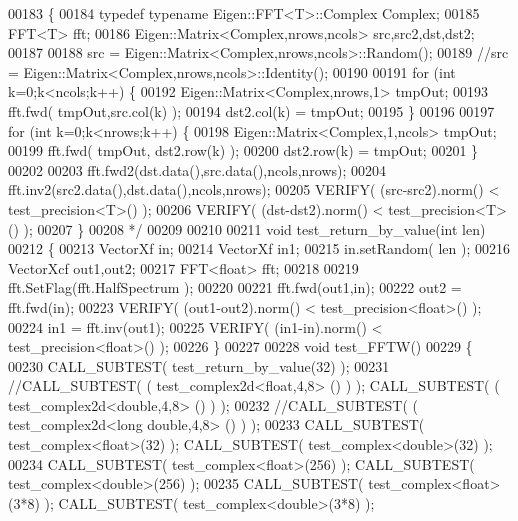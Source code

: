 \begin{DoxyCode}
00183 \textcolor{comment}{\{}
00184 \textcolor{comment}{    typedef typename Eigen::FFT<T>::Complex Complex;}
00185 \textcolor{comment}{    FFT<T> fft;}
00186 \textcolor{comment}{    Eigen::Matrix<Complex,nrows,ncols> src,src2,dst,dst2;}
00187 \textcolor{comment}{}
00188 \textcolor{comment}{    src = Eigen::Matrix<Complex,nrows,ncols>::Random();}
00189 \textcolor{comment}{    //src =  Eigen::Matrix<Complex,nrows,ncols>::Identity();}
00190 \textcolor{comment}{}
00191 \textcolor{comment}{    for (int k=0;k<ncols;k++) \{}
00192 \textcolor{comment}{        Eigen::Matrix<Complex,nrows,1> tmpOut;}
00193 \textcolor{comment}{        fft.fwd( tmpOut,src.col(k) );}
00194 \textcolor{comment}{        dst2.col(k) = tmpOut;}
00195 \textcolor{comment}{    \}}
00196 \textcolor{comment}{}
00197 \textcolor{comment}{    for (int k=0;k<nrows;k++) \{}
00198 \textcolor{comment}{        Eigen::Matrix<Complex,1,ncols> tmpOut;}
00199 \textcolor{comment}{        fft.fwd( tmpOut,  dst2.row(k) );}
00200 \textcolor{comment}{        dst2.row(k) = tmpOut;}
00201 \textcolor{comment}{    \}}
00202 \textcolor{comment}{}
00203 \textcolor{comment}{    fft.fwd2(dst.data(),src.data(),ncols,nrows);}
00204 \textcolor{comment}{    fft.inv2(src2.data(),dst.data(),ncols,nrows);}
00205 \textcolor{comment}{    VERIFY( (src-src2).norm() < test\_precision<T>() );}
00206 \textcolor{comment}{    VERIFY( (dst-dst2).norm() < test\_precision<T>() );}
00207 \textcolor{comment}{\}}
00208 \textcolor{comment}{*/}
00209 
00210 
00211 \textcolor{keywordtype}{void} test\_return\_by\_value(\textcolor{keywordtype}{int} len)
00212 \{
00213     VectorXf in;
00214     VectorXf in1;
00215     in.setRandom( len );
00216     VectorXcf out1,out2;
00217     FFT<float> fft;
00218 
00219     fft.SetFlag(fft.HalfSpectrum );
00220 
00221     fft.fwd(out1,in);
00222     out2 = fft.fwd(in);
00223     VERIFY( (out1-out2).norm() < test\_precision<float>() );
00224     in1 = fft.inv(out1);
00225     VERIFY( (in1-in).norm() < test\_precision<float>() );
00226 \}
00227 
00228 \textcolor{keywordtype}{void} test\_FFTW()
00229 \{
00230   CALL\_SUBTEST( test\_return\_by\_value(32) );
00231   \textcolor{comment}{//CALL\_SUBTEST( ( test\_complex2d<float,4,8> () ) ); CALL\_SUBTEST( ( test\_complex2d<double,4,8> () ) );}
00232   \textcolor{comment}{//CALL\_SUBTEST( ( test\_complex2d<long double,4,8> () ) );}
00233   CALL\_SUBTEST( test\_complex<float>(32) ); CALL\_SUBTEST( test\_complex<double>(32) ); 
00234   CALL\_SUBTEST( test\_complex<float>(256) ); CALL\_SUBTEST( test\_complex<double>(256) ); 
00235   CALL\_SUBTEST( test\_complex<float>(3*8) ); CALL\_SUBTEST( test\_complex<double>(3*8) ); 

\end{DoxyCode}
